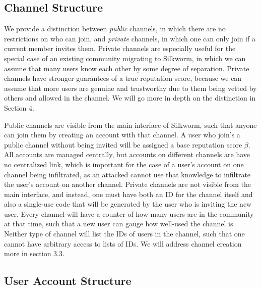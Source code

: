 \documentclass[letterpaper,twocolumn,10pt]{article}
\begin{document}
\subsection{Channel Structure}
We provide a distinction between \textit{public} channels, in which there are no restrictions on who can join, and \textit{private} channels, in which one can only join if a current member invites them. Private channels are especially useful for the special case of an existing community migrating to Silkworm, in which we can assume that many users know each other by some degree of separation. Private channels have stronger guarantees of a true reputation score, because we can assume that more users are genuine and trustworthy due to them being vetted by others and allowed in the channel. We will go more in depth on the distinction in Section 4.

Public channels are visible from the main interface of Silkworm, such that anyone can join them by creating an account with that channel. A user who join's a public channel without being invited will be assigned a base reputation score $\beta$. All accounts are managed centrally, but accounts on different channels are have no centralized link, which is important for the case of a user's account on one channel being infiltrated, as an attacked cannot use that knowledge to infiltrate the user's account on another channel. Private channels are not visible from the main interface, and instead, one must have both an ID for the channel itself and also a single-use code that will be generated by the user who is inviting the new user. Every channel will have a counter of how many users are in the community at that time, such that a new user can gauge how well-used the channel is. Neither type of channel will list the IDs of users in the channel, such that one cannot have arbitrary access to lists of IDs. We will address channel creation more in section $3.3$. 

\subsection{User Account Structure}
\end{document}
